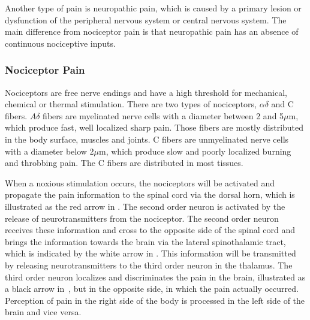 Another type of pain is neuropathic pain, which is caused by a primary lesion or dysfunction of the peripheral nervous system or central nervous system. The main difference from nociceptor pain is that neuropathic pain has an absence of continuous nociceptive inputs. \cite{Kerstman2013}

\subsubsection{Nociceptor Pain}
Nociceptors are free nerve endings and have a high threshold for mechanical, chemical or thermal stimulation. There are two types of nociceptors, $\alpha\delta$ and C fibers. $A\delta$ fibers are myelinated nerve cells with a diameter between 2 and 5$\mu$m, which produce fast, well localized sharp pain. Those fibers are mostly distributed in the body surface, muscles and joints. C fibers are unmyelinated nerve cells with a diameter below 2$\mu$m, which produce slow and poorly localized burning and throbbing pain. The C fibers are distributed in most tissues. \cite{Steeds2013}

When a noxious stimulation occurs, the nociceptors will be activated and propagate the pain information to the spinal cord via the dorsal horn, which is illustrated as the red arrow in . The second order neuron is activated by the release of neurotransmitters from the nociceptor. The second order neuron receives these information and cross  to the opposite side of the spinal cord and brings the information towards the brain via the lateral spinothalamic tract, which is indicated by the white arrow in . This information will be transmitted by releasing neurotransmitters to the third order neuron in the thalamus. The third order neuron localizes and discriminates the pain in the brain, illustrated as a black arrow in~, but in the opposite  side, in which the pain actually occurred. Perception of pain in the right side of the body is processed in the left side of the brain and vice versa. \cite{Martini2012} 


